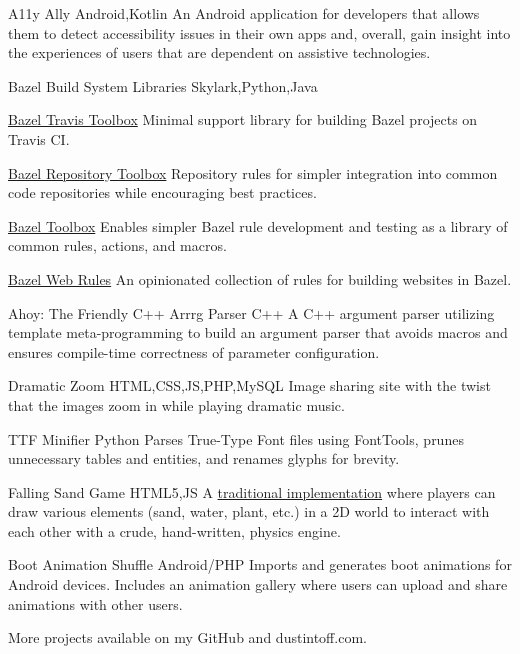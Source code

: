  {A11y Ally} {Android,Kotlin} {
    An Android application for developers that allows them to detect accessibility issues in their own apps and, overall, gain insight into the experiences of users that are dependent on assistive technologies.
}

\personalProject {} {Bazel Build System Libraries} {Skylark,Python,Java} {
    \begin {minimalItemize}
        \item \href {https://github.com/quittle/bazel_travis_toolbox} {Bazel Travis Toolbox} \spaceendash Minimal support library for building Bazel projects on Travis CI\@.
        \item \href {https://github.com/quittle/bazel_repository_toolbox} {Bazel Repository Toolbox} \spaceendash Repository rules for simpler integration into common code repositories while encouraging best practices.
        \item \href {https://github.com/quittle/bazel_toolbox} {Bazel Toolbox} \spaceendash Enables simpler Bazel rule development and testing as a library of common rules, actions, and macros.
        \item \href {https://github.com/quittle/rules_web} {Bazel Web Rules} \spaceendash An opinionated collection of rules for building websites in Bazel.
    \end {minimalItemize}
}

 {Ahoy: The Friendly C++ Arrrg Parser} {C++} {
    A C++ argument parser utilizing template meta-programming to build an argument parser that avoids macros and ensures compile-time correctness of parameter configuration.
}

 {Dramatic Zoom} {HTML,CSS,JS,PHP,MySQL} {
    Image sharing site with the twist that the images  {zoom in while playing dramatic music}.
}

 {TTF Minifier} {Python} {
    Parses True-Type Font files using  {FontTools}, prunes unnecessary tables and entities, and renames glyphs for brevity.
}

 {Falling Sand Game} {HTML5,JS} {
    A \href {https://en.wikipedia.org/wiki/Falling-sand_game} {traditional implementation} where players can draw various elements (sand, water, plant, etc.) in a 2D world to interact with each other with a crude, hand-written, physics engine.
}

 {Boot Animation Shuffle} {Android/PHP} {
    Imports and generates boot animations for Android devices. Includes an animation gallery where users can upload and share animations with other users.
}

More projects available on { {my GitHub}} and { {dustintoff.com}}.